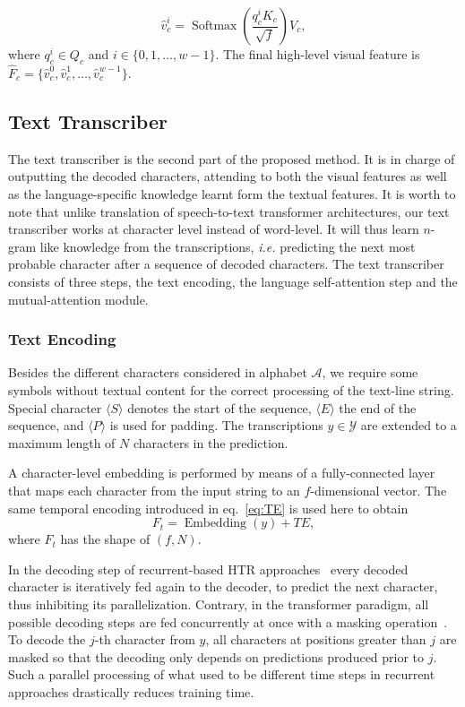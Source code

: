 \documentclass[10pt,twocolumn,letterpaper]{article}
\begin{document}
\begin{equation}
    \hat{v}_{c}^{i} = \operatorname{Softmax}\left(\frac{q_{c}^{i}K_{c}}{\sqrt{f}}\right)V_{c},
\end{equation}
where $q_{c}^{i} \in Q_{c}$ and $i \in \{0, 1, \ldots, w-1\}$. The final high-level visual feature is $\hat{F}_{c}=\{\hat{v}_{c}^{0}, \hat{v}_{c}^{1}, \ldots, \hat{v}_{c}^{w-1}\}$.
\subsection{Text Transcriber}
The text transcriber is the second part of the proposed method. It is in charge of outputting the decoded characters, attending to both the visual features as well as the language-specific knowledge learnt form the textual features. It is worth to note that unlike translation of speech-to-text transformer architectures, our text transcriber works at character level instead of word-level. It will thus learn $n$-gram like knowledge from the transcriptions, \emph{i.e.} predicting the next most probable character after a sequence of decoded characters. The text transcriber consists of three steps, the text encoding, the language self-attention step and the mutual-attention module. 

\subsubsection{Text Encoding}
Besides the different characters considered in alphabet $\mathcal{A}$, we require some symbols without textual content for the correct processing of the text-line string. Special character $\langle S\rangle$ denotes the start of the sequence, $\langle E\rangle$  the end of the sequence, and $\langle P\rangle$ is used for padding. The transcriptions $y \in \mathcal{Y}$ are extended to a maximum length of $N$ characters in the prediction. 

A character-level embedding is performed by means of a fully-connected layer that maps each character from the input string to an $f$-dimensional vector. The same temporal encoding introduced in eq.~\ref{eq:TE} is used here to obtain
\begin{equation}
    F_{t} = \operatorname{Embedding}\left(y \right) + TE,
\end{equation}
where $F_{t}$ has the shape of $(f, N)$. 

In the decoding step of recurrent-based HTR approaches~\cite{kang2018convolve,michael2019evaluating} every decoded character is iteratively fed again to the decoder, to predict the next character, thus inhibiting its parallelization. Contrary, in the transformer paradigm, all possible decoding steps are fed concurrently at once with a masking operation~\cite{vaswani2017attention}. To decode the $j$-th character from $y$, all characters at positions greater than $j$ are masked so that the decoding only depends on predictions produced prior to $j$. Such a parallel processing of what used to be different time steps in recurrent approaches drastically reduces training time. 
\end{document}
